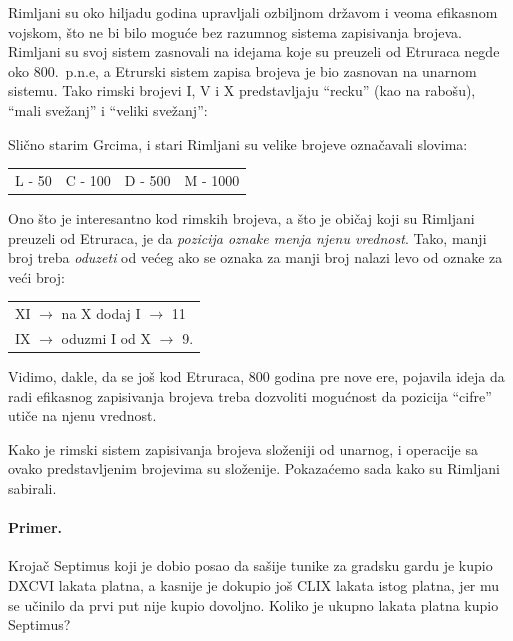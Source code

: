 Rimljani su oko hiljadu godina upravljali ozbiljnom dr\v zavom i veoma efikasnom vojskom, \v sto ne bi bilo mogu\'ce
bez razumnog sistema zapisivanja brojeva. Rimljani su svoj sistem zasnovali na idejama koje su preuzeli od Etruraca negde oko 800.\ p.n.e,
a Etrurski sistem zapisa brojeva je bio zasnovan na unarnom sistemu. Tako rimski brojevi I, V i X predstavljaju \enquote{recku} (kao na rabo\v su),
\enquote{mali sve\v zanj} i \enquote{veliki sve\v zanj}:
\begin{center}
    
\end{center}
Sli\v cno starim Grcima, i stari Rimljani su velike brojeve ozna\v cavali slovima:
\begin{center}
    \begin{tabular}{llll}
        L - 50 & C - 100 & D - 500 & M - 1000
    \end{tabular}
\end{center}
Ono \v sto je interesantno kod rimskih brojeva, a \v sto je obi\v caj koji su Rimljani preuzeli od Etruraca, je da \emph{pozicija oznake menja
njenu vrednost}. Tako, manji broj treba \emph{oduzeti} od ve\'ceg ako se oznaka za manji broj nalazi levo od oznake za ve\'ci broj:
\begin{center}
    \begin{tabular}{l}
        XI $\to$ na X dodaj I $\to$ 11\\
        IX $\to$ oduzmi I od X $\to$ 9.
    \end{tabular}
\end{center}
Vidimo, dakle, da se jo\v s kod Etruraca, 800 godina pre nove ere, pojavila ideja da radi efikasnog zapisivanja brojeva treba
dozvoliti mogu\'cnost da pozicija \enquote{cifre} uti\v ce na njenu vrednost.

Kako je rimski sistem zapisivanja brojeva slo\v zeniji od unarnog, i operacije sa ovako predstavljenim brojevima su
slo\v zenije. Pokaza\'cemo sada kako su Rimljani sabirali.

\paragraph{Primer.} Kroja\v c Septimus koji je dobio posao da sa\v sije tunike za gradsku gardu je kupio DXCVI lakata platna,
a kasnije je dokupio jo\v s CLIX lakata istog platna, jer mu se u\v cinilo da prvi put nije kupio dovoljno. Koliko je ukupno lakata
platna kupio Septimus?

\medskip

